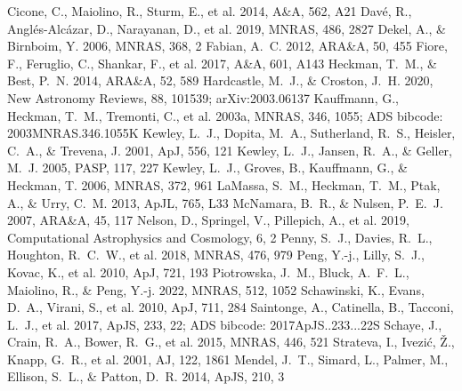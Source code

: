 \documentclass[twocolumn]{aastex631}
\begin{document}
\begin{thebibliography}{}
 Cicone, C., Maiolino, R., Sturm, E., et al. 2014, A\&A, 562, A21
 Dav{\'e}, R., Angl{\'e}s-Alc{\'a}zar, D., Narayanan, D., et al. 2019, MNRAS, 486, 2827
 Dekel, A., \& Birnboim, Y. 2006, MNRAS, 368, 2
 Fabian, A.~C. 2012, ARA\&A, 50, 455
 Fiore, F., Feruglio, C., Shankar, F., et al. 2017, A\&A, 601, A143
 Heckman, T.~M., \& Best, P.~N. 2014, ARA\&A, 52, 589
 Hardcastle, M.~J., \& Croston, J.~H. 2020, New Astronomy Reviews, 88, 101539; arXiv:2003.06137
 Kauffmann, G., Heckman, T.~M., Tremonti, C., et al. 2003a, MNRAS, 346, 1055; ADS bibcode: 2003MNRAS.346.1055K
 Kewley, L.~J., Dopita, M.~A., Sutherland, R.~S., Heisler, C.~A., \& Trevena, J. 2001, ApJ, 556, 121
 Kewley, L.~J., Jansen, R.~A., \& Geller, M.~J. 2005, PASP, 117, 227
 Kewley, L.~J., Groves, B., Kauffmann, G., \& Heckman, T. 2006, MNRAS, 372, 961
 LaMassa, S.~M., Heckman, T.~M., Ptak, A., \& Urry, C.~M. 2013, ApJL, 765, L33
 McNamara, B.~R., \& Nulsen, P.~E.~J. 2007, ARA\&A, 45, 117
 Nelson, D., Springel, V., Pillepich, A., et al. 2019, Computational Astrophysics and Cosmology, 6, 2
 Penny, S.~J., Davies, R.~L., Houghton, R.~C.~W., et al. 2018, MNRAS, 476, 979
 Peng, Y.-j., Lilly, S.~J., Kovac, K., et al. 2010, ApJ, 721, 193
 Piotrowska, J.~M., Bluck, A.~F.~L., Maiolino, R., \& Peng, Y.-j. 2022, MNRAS, 512, 1052
 Schawinski, K., Evans, D.~A., Virani, S., et al. 2010, ApJ, 711, 284
 Saintonge, A., Catinella, B., Tacconi, L.~J., et al. 2017, ApJS, 233, 22; ADS bibcode: 2017ApJS..233...22S
 Schaye, J., Crain, R.~A., Bower, R.~G., et al. 2015, MNRAS, 446, 521
 Strateva, I., Ivezi{\'c}, {\v Z}., Knapp, G.~R., et al. 2001, AJ, 122, 1861
 Mendel, J.~T., Simard, L., Palmer, M., Ellison, S.~L., \& Patton, D.~R. 2014, ApJS, 210, 3

\end{thebibliography}
\end{document}
